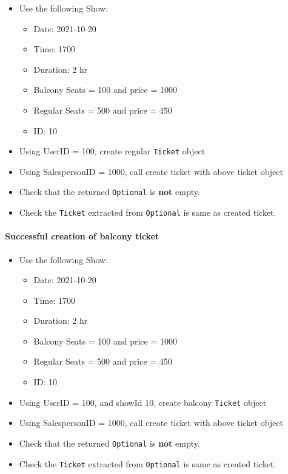 \documentclass[]{article}
\providecommand{\tightlist}{%
  \setlength{\itemsep}{0pt}\setlength{\parskip}{0pt}}
\let\oldparagraph\paragraph
\renewcommand{\paragraph}[1]{\oldparagraph{#1}\mbox{}}
\begin{document}
\begin{itemize}
\tightlist
\item
  Use the following Show:

  \begin{itemize}
  \tightlist
  \item
    Date: 2021-10-20
  \item
    Time: 1700
  \item
    Duration: 2 hr
  \item
    Balcony Seats = 100 and price = 1000
  \item
    Regular Seats = 500 and price = 450
  \item
    ID: 10
  \end{itemize}
\item
  Using UserID = 100, create regular \texttt{Ticket} object
\item
  Using SalespersonID = 1000, call create ticket with above ticket
  object
\item
  Check that the returned \texttt{Optional} is \textbf{not} empty.
\item
  Check the \texttt{Ticket} extracted from \texttt{Optional} is same as
  created ticket.
\end{itemize}

\hypertarget{successful-creation-of-balcony-ticket}{%
\paragraph{Successful creation of balcony
ticket}\label{successful-creation-of-balcony-ticket}}

\begin{itemize}
\tightlist
\item
  Use the following Show:

  \begin{itemize}
  \tightlist
  \item
    Date: 2021-10-20
  \item
    Time: 1700
  \item
    Duration: 2 hr
  \item
    Balcony Seats = 100 and price = 1000
  \item
    Regular Seats = 500 and price = 450
  \item
    ID: 10
  \end{itemize}
\item
  Using UserID = 100, and showId 10, create balcony \texttt{Ticket}
  object
\item
  Using SalespersonID = 1000, call create ticket with above ticket
  object
\item
  Check that the returned \texttt{Optional} is \textbf{not} empty.
\item
  Check the \texttt{Ticket} extracted from \texttt{Optional} is same as
  created ticket.
\end{itemize}
\end{document}
